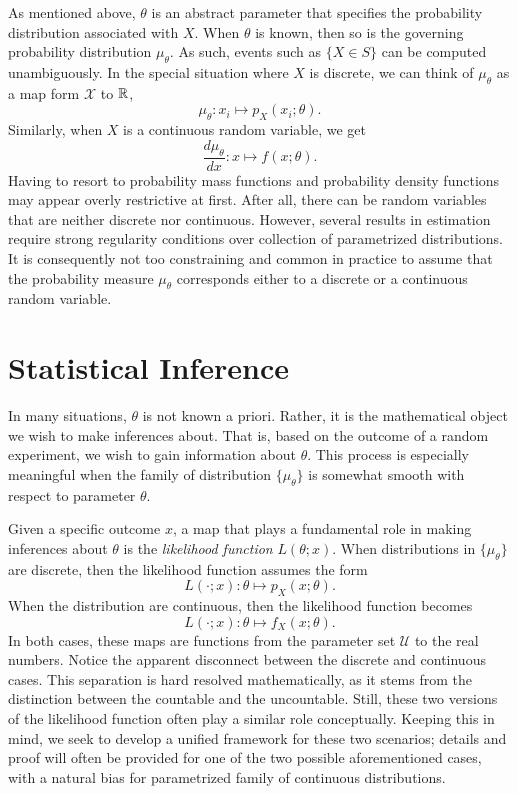 As mentioned above, $\theta$ is an abstract parameter that specifies the probability distribution associated with $X$.
When $\theta$ is known, then so is the governing probability distribution $\mu_{\theta}$.
As such, events such as $\{ X \in S \}$ can be computed unambiguously.
In the special situation where $X$ is discrete, we can think of $\mu_{\theta}$ as a map form $\mathcal{X}$ to $\mathbb{R}$,
\begin{equation*}
\mu_{\theta} : x_i \mapsto p_X (x_i; \theta) .
\end{equation*}
Similarly, when $X$ is a continuous random variable, we get
\begin{equation*}
\frac{d \mu_{\theta}}{dx} : x \mapsto f(x; \theta) .
\end{equation*}
Having to resort to probability mass functions and probability density functions may appear overly restrictive at first.
After all, there can be random variables that are neither discrete nor continuous.
However, several results in estimation require strong regularity conditions over collection of parametrized distributions.
It is consequently not too constraining and common in practice to assume that the probability measure $\mu_{\theta}$ corresponds either to a discrete or a continuous random variable.


\section{Statistical Inference}

In many situations, $\theta$ is not known a priori.
Rather, it is the mathematical object we wish to make inferences about.
That is, based on the outcome of a random experiment, we wish to gain information about $\theta$.
This process is especially meaningful when the family of distribution $\{ \mu_{\theta} \}$ is somewhat smooth with respect to parameter  $\theta$.

Given a specific outcome $x$, a map that plays a fundamental role in making inferences about $\theta$ is the \emph{likelihood function} $L(\theta; x)$.
When distributions in $\{ \mu_{\theta} \}$ are discrete, then the likelihood function assumes the form
\begin{equation*}
L(\cdot ; x) : \theta \mapsto p_X(x ; \theta) .
\end{equation*}
When the distribution are continuous, then the likelihood function becomes
\begin{equation*}
L(\cdot ; x) : \theta \mapsto f_X(x ; \theta) .
\end{equation*}
In both cases, these maps are functions from the parameter set $\mathcal{U}$ to the real numbers.
Notice the apparent disconnect between the discrete and continuous cases.
This separation is hard resolved mathematically, as it stems from the distinction between the countable and the uncountable.
Still, these two versions of the likelihood function often play a similar role conceptually.
Keeping this in mind, we seek to develop a unified framework for these two scenarios; details and proof will often be provided for one of the two possible aforementioned cases, with a natural bias for parametrized family of continuous distributions.

